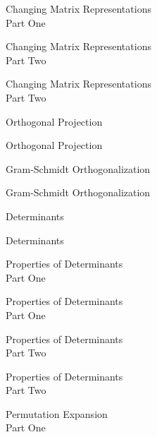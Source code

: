 \documentclass{titlescreen}
\begin{document}
\begin{videotitle}
  Changing Matrix Representations \\[1ex]
  Part One
\end{videotitle}
\begin{videoend}
  Changing Matrix Representations \\[1ex]
  Part Two
\end{videoend}

\begin{videotitle}
  Changing Matrix Representations \\[1ex]
  Part Two
\end{videotitle}
\begin{videoend}
  Orthogonal Projection  
\end{videoend}


\begin{videotitle}
  Orthogonal Projection
\end{videotitle}
\begin{videoend}
  Gram-Schmidt Orthogonalization
\end{videoend}

\begin{videotitle}
  Gram-Schmidt Orthogonalization
\end{videotitle}
\begin{videoend}
  Determinants
\end{videoend}





\begin{videotitle}
  Determinants  
\end{videotitle}
\begin{videoend}
  Properties of Determinants \\[1ex]
  Part One
\end{videoend}

\begin{videotitle}
  Properties of Determinants \\[1ex]
  Part One
\end{videotitle}
\begin{videoend}
  Properties of Determinants \\[1ex]
  Part Two
\end{videoend}

\begin{videotitle}
  Properties of Determinants \\[1ex]
  Part Two
\end{videotitle}
\begin{videoend}
  Permutation Expansion \\[1ex]
  Part One
\end{videoend}
\end{document}
